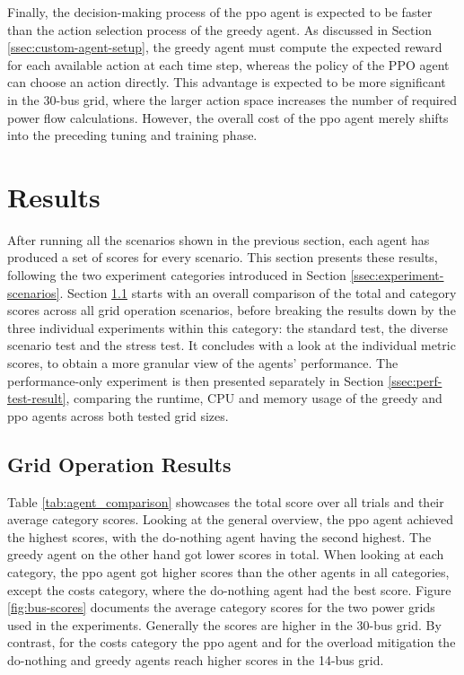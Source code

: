 Finally, the decision-making process of the \ac{ppo} agent is expected to be faster than the action selection process of the greedy agent. As discussed in Section \ref{ssec:custom-agent-setup}, the greedy agent must compute the expected reward for each available action at each time step, whereas the policy of the PPO agent can choose an action directly. This advantage is expected to be more significant in the 30-bus grid, where the larger action space increases the number of required power flow calculations. However, the overall cost of the \ac{ppo} agent merely shifts into the preceding tuning and training phase.











\section{Results}\label{sec:experiment-results}
After running all the scenarios shown in the previous section, each agent has produced a set of scores for every scenario. This section presents these results, following the two experiment categories introduced in Section \ref{ssec:experiment-scenarios}. Section \ref{ssec:grid-operation-results} starts with an overall comparison of the total and category scores across all grid operation scenarios, before breaking the results down by the three individual experiments within this category: the standard test, the diverse scenario test and the stress test. It concludes with a look at the individual metric scores, to obtain a more granular view of the agents' performance. The performance-only experiment is then presented separately in Section \ref{ssec:perf-test-result}, comparing the runtime, CPU and memory usage of the greedy and \ac{ppo} agents across both tested grid sizes.

\subsection{Grid Operation Results}\label{ssec:grid-operation-results}
Table \ref{tab:agent_comparison} showcases the total score over all trials and their average category scores. Looking at the general overview, the \ac{ppo} agent achieved the highest scores, with the do-nothing agent having the second highest. The greedy agent on the other hand got lower scores in total. When looking at each category, the \ac{ppo} agent got higher scores than the other agents in all categories, except the costs category, where the do-nothing agent had the best score. Figure \ref{fig:bus-scores} documents the average category scores for the two power grids used in the experiments. Generally the scores are higher in the 30-bus grid. By contrast, for the costs category the \ac{ppo} agent and for the overload mitigation the do-nothing and greedy agents reach higher scores in the 14-bus grid.

